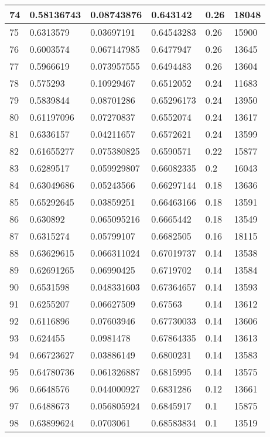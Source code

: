 \begin{longtable}{|l|l|l|l|l|l|}
74 & 0.58136743 & 0.08743876 & 0.643142 & 0.26 & 18048 \\ \hline 
75 & 0.6313579 & 0.03697191 & 0.64543283 & 0.26 & 15900 \\ \hline 
76 & 0.6003574 & 0.067147985 & 0.6477947 & 0.26 & 13645 \\ \hline 
77 & 0.5966619 & 0.073957555 & 0.6494483 & 0.26 & 13604 \\ \hline 
78 & 0.575293 & 0.10929467 & 0.6512052 & 0.24 & 11683 \\ \hline 
79 & 0.5839844 & 0.08701286 & 0.65296173 & 0.24 & 13950 \\ \hline 
80 & 0.61197096 & 0.07270837 & 0.6552074 & 0.24 & 13617 \\ \hline 
81 & 0.6336157 & 0.04211657 & 0.6572621 & 0.24 & 13599 \\ \hline 
82 & 0.61655277 & 0.075380825 & 0.6590571 & 0.22 & 15877 \\ \hline 
83 & 0.6289517 & 0.059929807 & 0.66082335 & 0.2 & 16043 \\ \hline 
84 & 0.63049686 & 0.05243566 & 0.66297144 & 0.18 & 13636 \\ \hline 
85 & 0.65292645 & 0.03859251 & 0.66463166 & 0.18 & 13591 \\ \hline 
86 & 0.630892 & 0.065095216 & 0.6665442 & 0.18 & 13549 \\ \hline 
87 & 0.6315274 & 0.05799107 & 0.6682505 & 0.16 & 18115 \\ \hline 
88 & 0.63629615 & 0.066311024 & 0.67019737 & 0.14 & 13538 \\ \hline 
89 & 0.62691265 & 0.06990425 & 0.6719702 & 0.14 & 13584 \\ \hline 
90 & 0.6531598 & 0.048331603 & 0.67364657 & 0.14 & 13593 \\ \hline 
91 & 0.6255207 & 0.06627509 & 0.67563 & 0.14 & 13612 \\ \hline 
92 & 0.6116896 & 0.07603946 & 0.67730033 & 0.14 & 13606 \\ \hline 
93 & 0.624455 & 0.0981478 & 0.67864335 & 0.14 & 13613 \\ \hline 
94 & 0.66723627 & 0.03886149 & 0.6800231 & 0.14 & 13583 \\ \hline 
95 & 0.64780736 & 0.061326887 & 0.6815995 & 0.14 & 13575 \\ \hline 
96 & 0.6648576 & 0.044000927 & 0.6831286 & 0.12 & 13661 \\ \hline 
97 & 0.6488673 & 0.056805924 & 0.6845917 & 0.1 & 15875 \\ \hline 
98 & 0.63899624 & 0.0703061 & 0.68583834 & 0.1 & 13519 \\ \hline 

\end{longtable}
